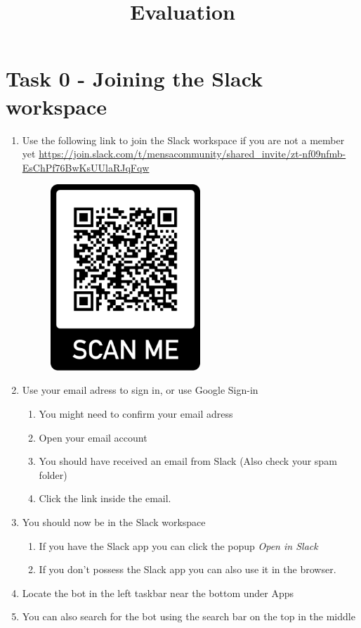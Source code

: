 


\title{Evaluation}



\maketitle

\section*{Task 0 - Joining the Slack workspace}
    
     
\begin{enumerate}
    \item Use the following link
    to join the Slack workspace if you are not a member yet
    \url{https://join.slack.com/t/mensacommunity/shared_invite/zt-nf09nfmb-EsChPf76BwKsUUlaRJqFqw}
    \begin{figure}[h]
        \centering
        \includegraphics[height=7cm]{../presentation/frame.png}
    \end{figure}
    \item Use your email adress to sign in, or use Google Sign-in
    \begin{enumerate}
    \item You might need to confirm your email adress
    \item Open your email account
    \item You should have received an email from Slack (Also check your spam folder)
    \item  Click the link inside the email. 
    \end{enumerate}
    \item You should now be  in the Slack workspace
    \begin{enumerate}
        \item If you have the Slack app you can click the popup \emph{Open in Slack}
        \item If you don't possess the Slack app you can also use it in the browser.
    \end{enumerate}
    \item Locate the bot in the left taskbar near the bottom under Apps
    \item You can also search for the bot using the search bar on the top in the middle
\end{enumerate}


